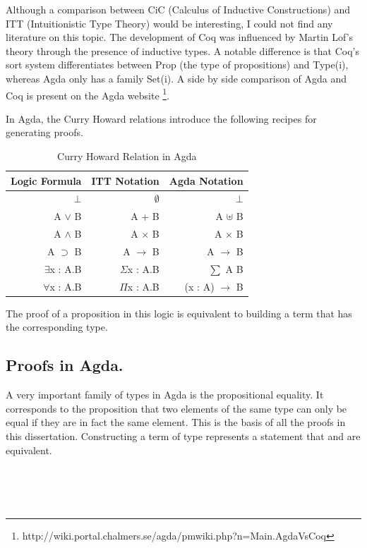 \documentclass[12pt,twoside,notitlepage]{report}
\begin{document}
Although a comparison between CiC (Calculus of Inductive Constructions) and ITT (Intuitionistic Type Theory) would be interesting, I could not find any literature on this topic. The development of Coq was influenced by Martin Lof’s theory through the presence of inductive types\cite{certified}. A notable difference is that Coq’s sort system differentiates between Prop (the type of propositions) and Type(i), whereas Agda only has a family Set(i). A side by side comparison of Agda and Coq is present on the Agda website \footnote{http://wiki.portal.chalmers.se/agda/pmwiki.php?n=Main.AgdaVsCoq}.

In Agda, the Curry Howard relations introduce the following recipes for generating proofs.

\begin{table}[h!]
\centering
	\begin{tabular}{r r r} 
	\hline 
	Logic Formula & ITT Notation & Agda Notation \\
	\hline
	$⊥$  & $∅$  & $⊥$ \\
	A $∨$ B & A + B &   A $⊎$ B \\
	A $∧$ B & A $×$ B &   A $×$ B \\
	A $⊃$ B & A $→$ B &   A $→$ B \\ 
	$∃$x : A.B & $Σ$x : A.B & $\sum$ A B \\
	$∀$x : A.B & $Π$x : A.B & (x : A) $→$  B\\ 
	\hline
	\end{tabular}
\caption{Curry Howard Relation in Agda}
\label{tab:curry}
\end{table} 

The proof of a proposition in this logic is equivalent to building a term that has the corresponding type.

\subsection{Proofs in Agda.}

A very important family of types in Agda is the propositional equality. It corresponds to the proposition that two elements of the same type can only be equal if they are in fact the same element. 
This is the basis of all the proofs in this dissertation. Constructing a term of type    represents a statement that  and  are equivalent.

\begin{code}
\\
\>  \AgdaSymbol{\{}\AgdaSymbol{\}} \AgdaSymbol{\{} \AgdaSymbol{:}  \AgdaSymbol{\}} \AgdaSymbol{(} \AgdaSymbol{:} \AgdaSymbol{)} \AgdaSymbol{:}     \<%
\\
\>[0]\<[2]%
\>[2] \AgdaSymbol{:}   \<%
\\
\end{code}
\end{document}
